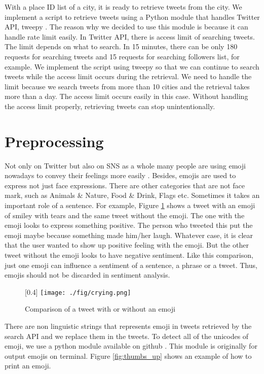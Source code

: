 With a place ID list of a city, it is ready to retrieve tweets from the city.
We implement a script to retrieve tweets using a Python module that handles Twitter API, tweepy \cite{tweepy}.
The reason why we decided to use this module is because it can handle rate limit easily.
In Twitter API, there is access limit of searching tweets.
The limit depends on what to search.
In 15 minutes, there can be only 180 requests for searching tweets and 15 requests for searching followers list, for example.
We implement the script using tweepy so that we can continue to search tweets while the access limit occurs during the retrieval.
We need to handle the limit because we search tweets from more than 10 cities and the retrieval takes more than a day.
The access limit occurs easily in this case.
Without handling the access limit properly, retrieving tweets can stop unintentionally.

\section{Preprocessing}\label{sec:preprocess}
Not only on Twitter but also on SNS as a whole many people are using emoji nowadays to convey their feelings more easily \cite{emoji}.
Besides, emojis are used to express not just face expressions.
There are other categories that are not face mark, such as Animals \& Nature, Food \& Drink, Flags etc.
Sometimes it takes an important role of a sentence.
For example, Figure \ref{fig:crying} shows a tweet with an emoji of smiley with tears and the same tweet without the emoji.
The one with the emoji looks to express something positive.
The person who tweeted this put the emoji maybe because something made him/her laugh.
Whatever case, it is clear that the user wanted to show up positive feeling with the emoji.
But the other tweet without the emoji looks to have negative sentiment.
Like this comparison, just one emoji can influence a sentiment of a sentence, a phrase or a tweet.
Thus, emojis should not be discarded in sentiment analysis.
\begin{figure}
	\centering
	\scalebox{0.4}[0.4]{
	\texttt{[image: ./fig/crying.png]}
	}
	\caption{Comparison of a tweet with or without an emoji}
	\label{fig:crying}
\end{figure}

There are non linguistic strings that represents emoji in tweets retrieved by the search API and we replace them in the tweets.
To detect all of the unicodes of emoji, we use a python module available on github \cite{emoji_package}. 
This module is originally for output emojis on terminal.
Figure \ref{fig:thumbs_up} shows an example of how to print an emoji.


